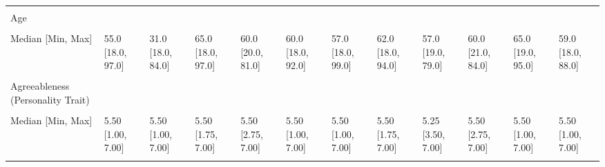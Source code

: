 \documentclass[
  single column]{article}
\begin{document}
\begin{landscape}
\begin{longtable}[t]{llllllllllll}
\endfoot
\bottomrule
\endlastfoot
\cellcolor{gray!10}{} & \cellcolor{gray!10}{(N=21551)} & \cellcolor{gray!10}{(N=658)} & \cellcolor{gray!10}{(N=1363)} & \cellcolor{gray!10}{(N=270)} & \cellcolor{gray!10}{(N=2017)} & \cellcolor{gray!10}{(N=3696)} & \cellcolor{gray!10}{(N=1095)} & \cellcolor{gray!10}{(N=136)} & \cellcolor{gray!10}{(N=87)} & \cellcolor{gray!10}{(N=576)} & \cellcolor{gray!10}{(N=744)}\\
Age &  &  &  &  &  &  &  &  &  &  & \\
\cellcolor{gray!10}{Mean (SD)} & \cellcolor{gray!10}{51.6 (16.8)} & \cellcolor{gray!10}{33.8 (12.6)} & \cellcolor{gray!10}{63.3 (12.2)} & \cellcolor{gray!10}{56.2 (14.2)} & \cellcolor{gray!10}{56.4 (15.1)} & \cellcolor{gray!10}{53.0 (16.6)} & \cellcolor{gray!10}{59.1 (14.4)} & \cellcolor{gray!10}{52.0 (17.5)} & \cellcolor{gray!10}{54.7 (16.3)} & \cellcolor{gray!10}{64.1 (11.5)} & \cellcolor{gray!10}{54.2 (16.7)}\\
Median [Min, Max] & 55.0 [18.0, 97.0] & 31.0 [18.0, 84.0] & 65.0 [18.0, 97.0] & 60.0 [20.0, 81.0] & 60.0 [18.0, 92.0] & 57.0 [18.0, 99.0] & 62.0 [18.0, 94.0] & 57.0 [19.0, 79.0] & 60.0 [21.0, 84.0] & 65.0 [19.0, 95.0] & 59.0 [18.0, 88.0]\\
\cellcolor{gray!10}{Missing} & \cellcolor{gray!10}{0 (0\%)} & \cellcolor{gray!10}{21 (3.2\%)} & \cellcolor{gray!10}{0 (0\%)} & \cellcolor{gray!10}{0 (0\%)} & \cellcolor{gray!10}{0 (0\%)} & \cellcolor{gray!10}{1 (0.0\%)} & \cellcolor{gray!10}{0 (0\%)} & \cellcolor{gray!10}{0 (0\%)} & \cellcolor{gray!10}{0 (0\%)} & \cellcolor{gray!10}{0 (0\%)} & \cellcolor{gray!10}{0 (0\%)}\\
\addlinespace
Agreeableness (Personality Trait) &  &  &  &  &  &  &  &  &  &  & \\
\cellcolor{gray!10}{Mean (SD)} & \cellcolor{gray!10}{5.30 (1.03)} & \cellcolor{gray!10}{5.30 (1.05)} & \cellcolor{gray!10}{5.46 (0.952)} & \cellcolor{gray!10}{5.49 (0.932)} & \cellcolor{gray!10}{5.34 (1.00)} & \cellcolor{gray!10}{5.44 (1.00)} & \cellcolor{gray!10}{5.38 (1.01)} & \cellcolor{gray!10}{5.36 (0.871)} & \cellcolor{gray!10}{5.47 (0.984)} & \cellcolor{gray!10}{5.39 (0.950)} & \cellcolor{gray!10}{5.36 (1.03)}\\
Median [Min, Max] & 5.50 [1.00, 7.00] & 5.50 [1.00, 7.00] & 5.50 [1.75, 7.00] & 5.50 [2.75, 7.00] & 5.50 [1.00, 7.00] & 5.50 [1.00, 7.00] & 5.50 [1.75, 7.00] & 5.25 [3.50, 7.00] & 5.50 [2.75, 7.00] & 5.50 [1.00, 7.00] & 5.50 [1.00, 7.00]\\
\cellcolor{gray!10}{Missing} & \cellcolor{gray!10}{51 (0.2\%)} & \cellcolor{gray!10}{3 (0.5\%)} & \cellcolor{gray!10}{3 (0.2\%)} & \cellcolor{gray!10}{0 (0\%)} & \cellcolor{gray!10}{5 (0.2\%)} & \cellcolor{gray!10}{12 (0.3\%)} & \cellcolor{gray!10}{4 (0.4\%)} & \cellcolor{gray!10}{0 (0\%)} & \cellcolor{gray!10}{0 (0\%)} & \cellcolor{gray!10}{1 (0.2\%)} & \cellcolor{gray!10}{4 (0.5\%)}\\

\end{longtable}
\end{landscape}
\end{document}
